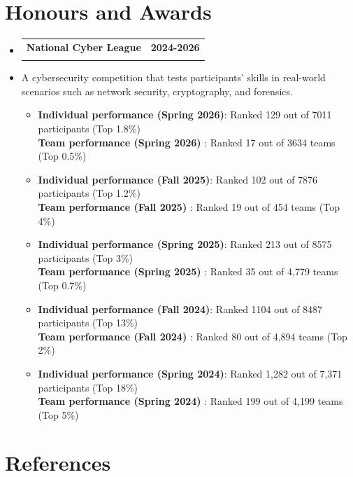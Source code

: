 \documentclass[letterpaper,11pt]{article}
\makeatletter
\newcommand{\resumeItem}[1]{
  \item\small{
    {#1 \vspace{-2pt}}
  }
}
\newcommand{\resumeSubheading}[4]{
  \vspace{-2pt}\item
    \begin{tabular*}{1.0\textwidth}[t]{l@{\extracolsep{\fill}}r}
      \textbf{#1} & \textbf{\small #2} \\
      \textit{\small#3} & \textit{\small #4} \\
    \end{tabular*}\vspace{-7pt}
}
\newcommand{\resumeSubHeadingListStart}{\begin{itemize}[leftmargin=0.0in, label={}]}
\newcommand{\resumeSubHeadingListEnd}{\end{itemize}}
\makeatother
\begin{document}
\section{Honours and Awards}

\resumeSubHeadingListStart
\resumeSubheading{National Cyber League}{2024-2026}{}{}
\vspace{-15pt}
\resumeItem{
    A cybersecurity competition that tests participants' skills in real-world scenarios such as network security, cryptography, and forensics.
}
\begin{itemize}[leftmargin=0.15in, label={}]
  \item{
        \textbf{Individual performance (Spring 2026)}{: Ranked 129 out of 7011 participants (Top 1.8\%)} \\
        \textbf{Team performance (Spring 2026)} {: Ranked 17 out of 3634 teams (Top 0.5\%)} \\
        }
  \item{
        \textbf{Individual performance (Fall 2025)}{: Ranked 102 out of 7876 participants (Top 1.2\%)} \\
        \textbf{Team performance (Fall 2025)} {: Ranked 19 out of 454 teams (Top 4\%)} \\
        }
  \item{
        \textbf{Individual performance (Spring 2025)}{: Ranked 213 out of 8575 participants (Top 3\%)} \\
        \textbf{Team performance (Spring 2025)} {: Ranked 35 out of 4,779 teams (Top 0.7\%)} \\
        }
  \item{
        \textbf{Individual performance (Fall 2024)}{: Ranked 1104 out of 8487 participants (Top 13\%)} \\
        \textbf{Team performance (Fall 2024)} {: Ranked 80 out of 4,894 teams (Top 2\%)} \\
        }
  \item{
        \textbf{Individual performance (Spring 2024)}{: Ranked 1,282 out of 7,371 participants (Top 18\%)} \\
        \textbf{Team performance (Spring 2024)} {: Ranked 199 out of 4,199 teams (Top 5\%)} \\
        }  
\end{itemize}
\vspace{-10pt}

\resumeSubHeadingListEnd

\section{References}
\end{document}
